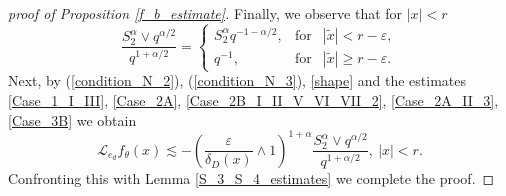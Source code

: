 \documentclass[a4paper,12pt,reqno]{amsart}
\theoremstyle{definition}
\theoremstyle{remark}
\newcommand{\eps}{\varepsilon}
\newcommand{\calL}{\mathcal{L}}
\begin{document}
\begin{proof}[proof of Proposition \ref{f_b_estimate}]
Finally, we observe that for $|x|<r $
\begin{equation}
\label{shape}
\frac{S_2^\alpha\vee q^{\alpha/2}}{q^{1+\alpha/2}}= \left\{             
\begin{array}{lll}                   
\displaystyle{ {S_2^\alpha}{q^{-1-\alpha/2}}},&\text{for}& |\tilde{x}|< r-\eps, \\  
q^{-1},&\text{for}& |\tilde{x}|\ge r-\eps.
\end{array}       
\right. 
\end{equation}
Next, by (\ref{condition_N_2}), (\ref{condition_N_3}), \eqref{shape} and  the estimates
\eqref{Case_1_I_III},
\eqref{Case_2A},
\eqref{Case_2B_I_II_V_VI_VII_2},
\eqref{Case_2A_II_3},
\eqref{Case_3B} we obtain 
\begin{equation}
\label{Case all}
\calL_{e_d} f_{\theta}(x) \lesssim - \left (\frac\eps { \delta_D(x)}\wedge 1\right)^{1+\alpha} \frac{  S_{2}^{ \alpha}\vee q^{\alpha/2}}{q^{1+\alpha/2}},\ |x|<r.
\end{equation}
Confronting this with Lemma \ref{S_3_S_4_estimates} we complete the proof.
\end{proof}
\end{document}
